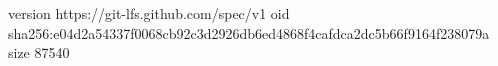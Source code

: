 version https://git-lfs.github.com/spec/v1
oid sha256:e04d2a54337f0068cb92c3d2926db6ed4868f4cafdca2dc5b66f9164f238079a
size 87540
